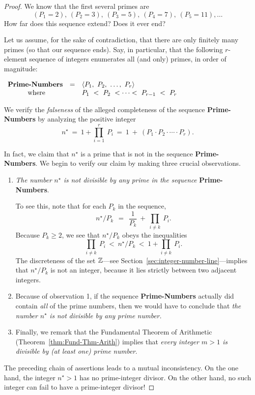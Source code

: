 \begin{proof}
We know that the first several primes are
\[ (P_1 =2), \ (P_2 = 3), \ (P_3 =5), \ (P_4 = 7), \ (P_5 =11), \ldots \] 
How far does this sequence extend?  Does it ever end?

Let us assume, for the sake of contradiction, that there are only
finitely many primes (so that our sequence ends).  Say, in particular,
that the following $r$-element sequence of integers enumerates all
(and only) primes, in order of magnitude:

\medskip

$ \begin{array}{ccl}
\mbox{\bf Prime-Numbers} & = & 
\langle P_1, \ P_2, \ \ldots, \ P_r \rangle \\
\mbox{ where} &  &
P_1 \ < \ P_2 \ < \cdots < \ P_{r-1} \ < \ P_r
\end{array}
$

\medskip

We verify the {\em falseness} of the alleged completeness of the sequence
{\bf Prime-Numbers} by analyzing the positive integer
\[ n^\star \ = \ 1 + \prod_{i=1}^r \ P_i \ = \ 1 \ + \ 
\left(P_1 \cdot P_2 \cdot \cdots \cdot P_r \right).
\]

In fact, we claim that $n^\star$ is a prime that is not in the
sequence {\bf Prime-Numbers}.  We begin to verify our claim by making
three crucial observations.
\begin{enumerate}
\item
{\em The number $n^\star$ is not divisible by any prime in the sequence}
{\bf Prime-Numbers}.

To see this, note that for each $P_k$ in the sequence,
\[
n^\star / P_k \ \ = \ \ \frac{1}{P_k} \ + \ \prod_{i \neq k} \ P_i .
\]
Because $P_k \geq 2$, we see that $n^\star / P_k$ obeys the inequalities
\[
\prod_{i \neq k} \ P_i \ < \ n^\star /P_k \ < \ 1 + \prod_{i \neq k} \ P_i.
\] 
The discreteness of the set $\mathbb{Z}$---see
Section~\ref{sec:integer-number-line}---implies that $n^\star / P_k$ is not
an integer, because it lies strictly between two adjacent integers.

\item
Because of observation 1, if the sequence {\bf Prime-Numbers} actually
did contain {\em all} of the prime numbers, then we would have to
conclude that {\em the number $n^\star$ is not divisible by any prime
  number.}

\item
Finally, we remark that the Fundamental Theorem of Arithmetic
(Theorem~\ref{thm:Fund-Thm-Arith}) implies that {\em every integer $m
  >1$ is divisible by (at least one) prime number}.
\end{enumerate}
The preceding chain of assertions leads to a mutual inconsistency.  On
the one hand, the integer $n^\star >1$ has no prime-integer divisor.
On the other hand, no such integer can fail to have a prime-integer
divisor!


\end{proof}
